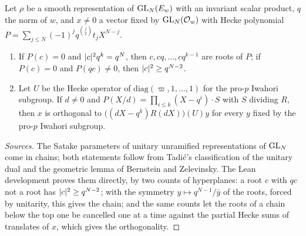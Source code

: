 \begin{theorem}\label{thm:B-chains}
Let $\rho$ be a smooth representation of $\operatorname{GL}_N(E_w)$ with an invariant scalar product, $q$ the norm of $w$, and $x\ne0$ a vector fixed by $\operatorname{GL}_N(\mathcal{O}_w)$ with Hecke polynomial $P=\sum_{j\le N}(-1)^jq^{\binom j2}t_jX^{N-j}$.
\begin{enumerate}[label=\textup{(\alph*)}]
\item If $P(c)=0$ and $\lvert c\rvert^2q^k=q^N$, then $c,cq,\dots,cq^{k-1}$ are roots of $P$; if $P(c)=0$ and $P(qc)\ne0$, then $\lvert c\rvert^2\ge q^{N-2}$.
\item Let $U$ be the Hecke operator of $\mathrm{diag}(\varpi,1,\dots,1)$ for the pro-$p$ Iwahori subgroup. If $d\ne0$ and $P(X/d)=\prod_{i\le k}(X-q^i)\cdot S$ with $S$ dividing $R$, then $x$ is orthogonal to
$\bigl((dX-q^k)R(dX)\bigr)(U)y$ for every $y$ fixed by the pro-$p$ Iwahori subgroup.
\end{enumerate}
\end{theorem}

\begin{proof}[Sources]
The Satake parameters of unitary unramified representations of $\operatorname{GL}_N$ come in chains; both statements follow from Tadi\'c's classification of the unitary dual \cite{Tadic1986} and the geometric lemma of Bernstein and Zelevinsky. The Lean
development proves them directly, by two counts of hyperplanes: a root $c$ with $qc$ not a root has $\lvert c\rvert^2\ge q^{N-2}$; with the symmetry $y\mapsto q^{N-1}/\bar y$ of the roots, forced by unitarity, this gives the chain; and the same counts let
the roots of a chain below the top one be cancelled one at a time against the partial Hecke sums of translates of $x$, which gives the orthogonality.
\end{proof}

